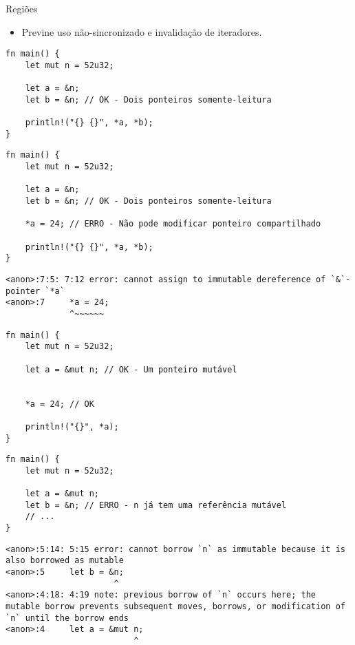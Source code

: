 \documentclass{beamer}
\begin{document}
\begin{frame}[fragile]{Regiões}
	\begin{itemize}
		\item Previne uso não-sincronizado e invalidação de iteradores.
	\end{itemize}
	
	\begin{overprint}
	\begin{lstlisting}
fn main() {
    let mut n = 52u32;
    
    let a = &n;
    let b = &n; // OK - Dois ponteiros somente-leitura
    
    println!("{} {}", *a, *b);
}
	\end{lstlisting}

	\begin{lstlisting}
fn main() {
    let mut n = 52u32;
    
    let a = &n;
    let b = &n; // OK - Dois ponteiros somente-leitura
    
    *a = 24; // ERRO - Não pode modificar ponteiro compartilhado
    
    println!("{} {}", *a, *b);
}
	\end{lstlisting}
	\begin{lstlisting}[numbers=none, breaklines=true]
<anon>:7:5: 7:12 error: cannot assign to immutable dereference of `&`-pointer `*a`
<anon>:7     *a = 24;
             ^~~~~~~
	\end{lstlisting}
	
	\begin{lstlisting}
fn main() {
    let mut n = 52u32;
    
    let a = &mut n; // OK - Um ponteiro mutável

    
    *a = 24; // OK
    
    println!("{}", *a);
}
	\end{lstlisting}

	\begin{lstlisting}
fn main() {
    let mut n = 52u32;
    
    let a = &mut n;
    let b = &n; // ERRO - n já tem uma referência mutável
    // ...
}
	\end{lstlisting}
	\begin{lstlisting}[numbers=none, breaklines=true]
<anon>:5:14: 5:15 error: cannot borrow `n` as immutable because it is also borrowed as mutable
<anon>:5     let b = &n;
                      ^
<anon>:4:18: 4:19 note: previous borrow of `n` occurs here; the mutable borrow prevents subsequent moves, borrows, or modification of `n` until the borrow ends
<anon>:4     let a = &mut n;
                          ^
	\end{lstlisting}
	\end{overprint}
\end{frame}
\end{document}
